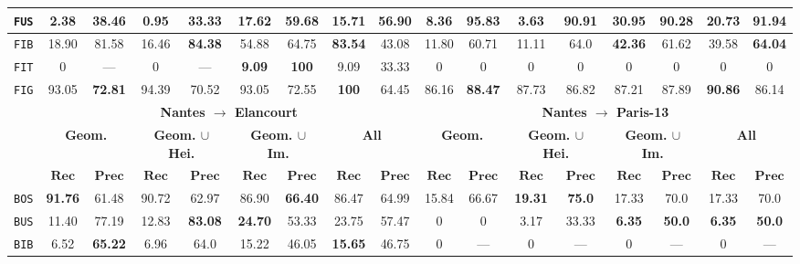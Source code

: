 \begin{sidewaystable}
\begin{center}
\begin{tabular}{|c | c c | c c | c c | c c || c c | c c | c c | c c |}
                    \hline
                    \texttt{FUS} & 2.38 & 38.46 & 0.95 & 33.33 & \textbf{17.62} & \textbf{59.68} & 15.71 & 56.90 & 8.36 & \textbf{95.83} & 3.63 & 90.91 & \textbf{30.95} & 90.28 & 20.73 & 91.94 \\
                    \hline
                    \texttt{FIB} & 18.90 & 81.58 & 16.46 & \textbf{84.38} & 54.88 & 64.75 & \textbf{83.54} & 43.08 & 11.80 & 60.71 & 11.11 & 64.0 & \textbf{42.36} & 61.62 & 39.58 & \textbf{64.04} \\ 
                    \hline
                    \texttt{FIT} & 0 & --- & 0 & --- & \textbf{9.09} & \textbf{100} & 9.09 & 33.33 & 0 & 0 & 0 & 0 & 0 & 0 & 0 & 0 \\
                    \hline
                    \texttt{FIG} & 93.05 & \textbf{72.81} & 94.39 & 70.52 & 93.05 & 72.55 & \textbf{100} & 64.45 & 86.16 & \textbf{88.47} & 87.73 & 86.82 & 87.21 & 87.89 & \textbf{90.86} & 86.14 \\
                    \hline
                    \hline
                    & \multicolumn{8}{c||}{\textbf{Nantes $\rightarrow$ Elancourt}} & \multicolumn{8}{c|}{\textbf{Nantes $\rightarrow$ Paris-13}}\\
                    \hline
                    &\multicolumn{2}{c|}{\textbf{Geom.}} & \multicolumn{2}{c|}{\textbf{Geom. $\cup$ Hei.}} & \multicolumn{2}{c|}{\textbf{Geom. $\cup$ Im.}} & \multicolumn{2}{c||}{\textbf{All}} & \multicolumn{2}{c|}{\textbf{Geom.}} & \multicolumn{2}{c|}{\textbf{Geom. $\cup$ Hei.}} & \multicolumn{2}{c|}{\textbf{Geom. $\cup$ Im.}} & \multicolumn{2}{x{1.5cm}|}{\textbf{All}}\\
                    \cline{2-17}
                    & $\bm{Rec}$ & $\bm{Prec}$ &  $\bm{Rec}$ & $\bm{Prec}$ &  $\bm{Rec}$ & $\bm{Prec}$ &  $\bm{Rec}$ & $\bm{Prec}$ & $\bm{Rec}$ & $\bm{Prec}$ &  $\bm{Rec}$ & $\bm{Prec}$ &  $\bm{Rec}$ & $\bm{Prec}$ &  $\bm{Rec}$ & $\bm{Prec}$ \\
                    \hline
                    \texttt{BOS} & \textbf{91.76} & 61.48 & 90.72 & 62.97 & 86.90 & \textbf{66.40} & 86.47 & 64.99 & 15.84 & 66.67 & \textbf{19.31} & \textbf{75.0} & 17.33 & 70.0 & 17.33 & 70.0 \\
                    \hline
                    \texttt{BUS} & 11.40 & 77.19 & 12.83 & \textbf{83.08} & \textbf{24.70} & 53.33 & 23.75 & 57.47 & 0 & 0 & 3.17 & 33.33 & \textbf{6.35} & \textbf{50.0} & \textbf{6.35} & \textbf{50.0} \\
                    \hline
                    \texttt{BIB} & 6.52 & \textbf{65.22} & 6.96 & 64.0 & 15.22 & 46.05 & \textbf{15.65} & 46.75 & 0 & --- & 0 & --- & 0 & --- & 0 & --- \\

\end{tabular}
\end{center}
\end{sidewaystable}
